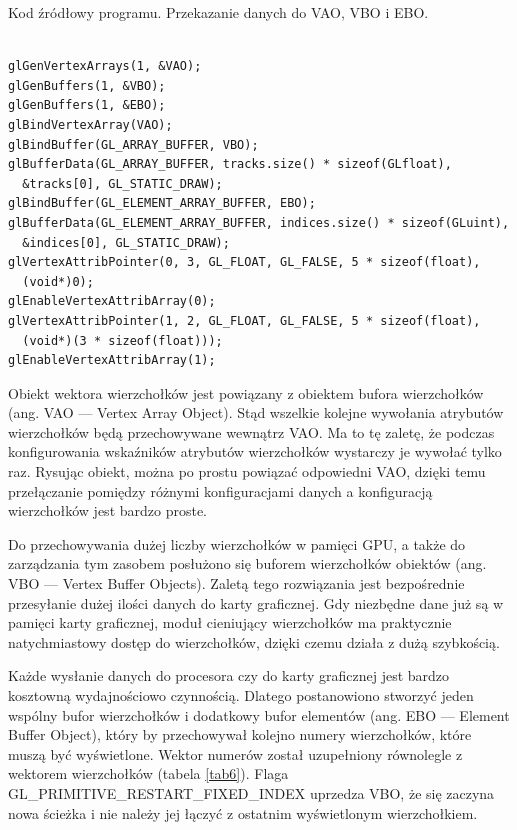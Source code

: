 \begin{table}[H]
\caption{Kod źródłowy programu. Przekazanie danych do VAO, VBO i EBO.}
\label{tab7}
\begin{lstlisting}[frame=single]  % Start your code-block

glGenVertexArrays(1, &VAO);
glGenBuffers(1, &VBO);
glGenBuffers(1, &EBO);
glBindVertexArray(VAO);
glBindBuffer(GL_ARRAY_BUFFER, VBO);
glBufferData(GL_ARRAY_BUFFER, tracks.size() * sizeof(GLfloat),
  &tracks[0], GL_STATIC_DRAW);
glBindBuffer(GL_ELEMENT_ARRAY_BUFFER, EBO);
glBufferData(GL_ELEMENT_ARRAY_BUFFER, indices.size() * sizeof(GLuint),
  &indices[0], GL_STATIC_DRAW);
glVertexAttribPointer(0, 3, GL_FLOAT, GL_FALSE, 5 * sizeof(float),
  (void*)0);
glEnableVertexAttribArray(0);
glVertexAttribPointer(1, 2, GL_FLOAT, GL_FALSE, 5 * sizeof(float),
  (void*)(3 * sizeof(float)));
glEnableVertexAttribArray(1);
\end{lstlisting}
\end{table}

Obiekt wektora wierzchołków jest powiązany z obiektem bufora wierzchołków (ang. VAO --- Vertex Array Object). Stąd wszelkie kolejne wywołania atrybutów wierzchołków będą przechowywane wewnątrz VAO. Ma to tę zaletę, że podczas konfigurowania wskaźników atrybutów wierzchołków wystarczy je wywołać tylko raz. Rysując obiekt, można po prostu powiązać odpowiedni VAO, dzięki temu przełączanie pomiędzy różnymi konfiguracjami danych a konfiguracją wierzchołków jest bardzo proste.

Do przechowywania dużej liczby wierzchołków w pamięci GPU, a także do zarządzania tym zasobem posłużono się buforem wierzchołków obiektów (ang. VBO --- Vertex Buffer Objects). Zaletą tego rozwiązania jest bezpośrednie przesyłanie dużej ilości danych do karty graficznej. Gdy niezbędne dane już są w pamięci karty graficznej, moduł cieniujący wierzchołków ma praktycznie natychmiastowy dostęp do wierzchołków, dzięki czemu działa z dużą szybkością.

Każde wysłanie danych do procesora czy do karty graficznej jest bardzo kosztowną wydajnościowo czynnością. Dlatego postanowiono stworzyć jeden wspólny bufor wierzchołków i dodatkowy bufor elementów (ang. EBO --- Element Buffer Object), który by przechowywał kolejno numery wierzchołków, które muszą być wyświetlone. Wektor numerów został uzupełniony równolegle z wektorem wierzchołków (tabela \ref{tab6}). Flaga GL\_PRIMITIVE\_RESTART\_FIXED\_INDEX uprzedza VBO, że się zaczyna nowa ścieżka i nie należy jej łączyć z ostatnim wyświetlonym wierzchołkiem.

